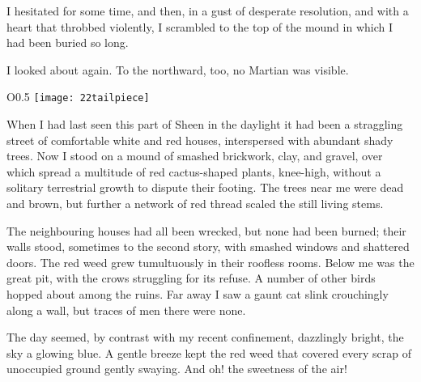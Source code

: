 I hesitated for some time, and then, in a gust of desperate resolution, and with a heart that throbbed violently, I scrambled to the top of the mound in which I had been buried so long.

I looked about again. To the northward, too, no Martian was visible.

	\begin{wrapfigure}{O}{0.5\textwidth}
		\centering
		\texttt{[image: 22tailpiece]}
	\end{wrapfigure}

When I had last seen this part of Sheen in the daylight it had been a straggling street of comfortable white and red houses, interspersed with abundant shady trees. Now I stood on a mound of smashed brickwork, clay, and gravel, over which spread a multitude of red cactus-shaped plants, knee-high, without a solitary terrestrial growth to dispute their footing. The trees near me were dead and brown, but further a network of red thread scaled the still living stems.

The neighbouring houses had all been wrecked, but none had been burned; their walls stood, sometimes to the second story, with smashed windows and shattered doors. The red weed grew tumultuously in their roofless rooms. Below me was the great pit, with the crows struggling for its refuse. A number of other birds hopped about among the ruins. Far away I saw a gaunt cat slink crouchingly along a wall, but traces of men there were none.



The day seemed, by contrast with my recent confinement, dazzlingly bright, the sky a glowing blue. A gentle breeze kept the red weed that covered every scrap of unoccupied ground gently swaying. And oh! the sweetness of the air!

